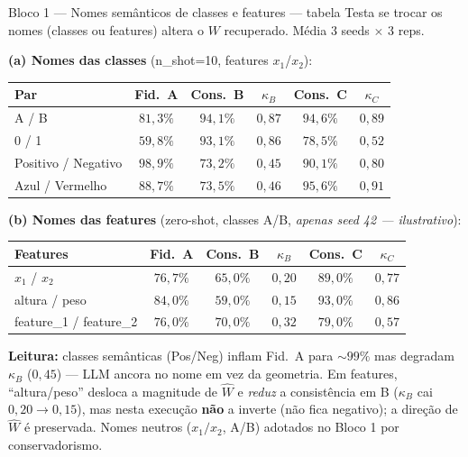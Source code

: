 \documentclass[aspectratio=169,10pt]{beamer}
\begin{document}
\begin{frame}{Bloco 1 --- Nomes sem\^anticos de classes e features --- tabela}
  \scriptsize
  Testa se trocar os nomes (classes ou features) altera o $W$ recuperado. M\'edia 3 seeds $\times$ 3 reps.
  \medskip

  \textbf{(a) Nomes das classes} (n\_shot=10, features $x_1$/$x_2$):
  \begin{center}
  \begin{tabular}{lccccc}
    \toprule
    Par                  & Fid.\ A & Cons.\ B & $\kappa_B$ & Cons.\ C & $\kappa_C$ \\
    \midrule
    A / B                & $81{,}3\%$ & $94{,}1\%$ & $0{,}87$ & $94{,}6\%$ & $0{,}89$ \\
    0 / 1                & $59{,}8\%$ & $93{,}1\%$ & $0{,}86$ & $78{,}5\%$ & $0{,}52$ \\
    Positivo / Negativo  & $98{,}9\%$ & $73{,}2\%$ & $0{,}45$ & $90{,}1\%$ & $0{,}80$ \\
    Azul / Vermelho      & $88{,}7\%$ & $73{,}5\%$ & $0{,}46$ & $95{,}6\%$ & $0{,}91$ \\
    \bottomrule
  \end{tabular}
  \end{center}
  \medskip

  \textbf{(b) Nomes das features} (zero-shot, classes A/B, \emph{apenas seed 42 --- ilustrativo}):
  \begin{center}
  \begin{tabular}{lccccc}
    \toprule
    Features                & Fid.\ A & Cons.\ B & $\kappa_B$ & Cons.\ C & $\kappa_C$ \\
    \midrule
    $x_1$ / $x_2$           & $76{,}7\%$ & $65{,}0\%$ & $0{,}20$ & $89{,}0\%$ & $0{,}77$ \\
    altura / peso           & $84{,}0\%$ & $59{,}0\%$ & $0{,}15$ & $93{,}0\%$ & $0{,}86$ \\
    feature\_1 / feature\_2 & $76{,}0\%$ & $70{,}0\%$ & $0{,}32$ & $79{,}0\%$ & $0{,}57$ \\
    \bottomrule
  \end{tabular}
  \end{center}
  \tiny
  \textbf{Leitura:} classes sem\^anticas (Pos/Neg) inflam Fid.\ A para $\sim99\%$ mas degradam $\kappa_B$ ($0{,}45$) --- LLM ancora no nome em vez da geometria. Em features, ``altura/peso'' desloca a magnitude de $\hat W$ e \emph{reduz} a consist\^encia em B ($\kappa_B$ cai $0{,}20 \to 0{,}15$), mas nesta execu\c{c}\~ao \textbf{n\~ao} a inverte (n\~ao fica negativo); a dire\c{c}\~ao de $\hat W$ \'e preservada. Nomes neutros ($x_1/x_2$, A/B) adotados no Bloco 1 por conservadorismo.
\end{frame}
\end{document}
